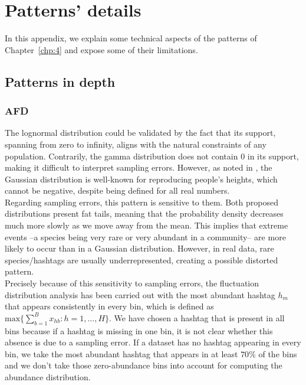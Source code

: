 \chapter{Patterns' details}\label{appen:patterns}
In this appendix, we explain some technical aspects of the patterns of Chapter~\ref{chp:4} and expose some of their limitations.


\section{Patterns in depth}
\subsection{AFD}
The lognormal distribution could be validated by the fact that its support, spanning from zero to infinity, aligns with the natural constraints of any population. Contrarily, the gamma distribution does not contain $0$ in its support, making it difficult to interpret sampling errors. However, as noted in \cite{halley2002lognormality}, the Gaussian distribution is well-known for reproducing people's heights, which cannot be negative, despite being defined for all real numbers. \\

Regarding sampling errors, this pattern is sensitive to them. Both proposed distributions present fat tails, meaning that the probability density decreases much more slowly as we move away from the mean.  This implies that extreme events --a species being very rare or very abundant in a community-- are more likely to occur than in a Gaussian distribution. However, in real data, rare species/hashtags are usually underrepresented, creating a possible distorted pattern. \\

Precisely because of this sensitivity to sampling errors, the fluctuation distribution analysis has been carried out with the most abundant hashtag $h_m$ that appears consistently in every bin, which is defined as $\textrm{max}\{ \sum_{b=1}^B x_{hb}: h = 1,...,H \}$. %
We have chosen a hashtag that is present in all bins because if a hashtag is missing in one bin, it is not clear whether this absence is due to a sampling error. If a dataset has no hashtag appearing in every bin, we take the most abundant hashtag that appears in at least $70\%$ of the bins and we don't take those zero-abundance bins into account for computing the abundance distribution. \\


